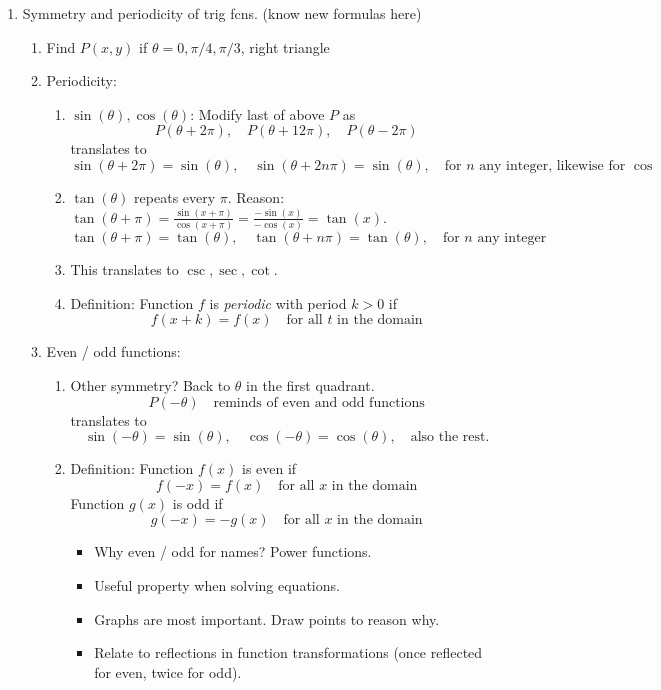 \documentclass{article}
\begin{document}
\begin{enumerate}
\item Symmetry and periodicity of trig fcns. (know new formulas here)
\begin{enumerate}
\item Find $P(x,y)$ if $\theta = 0, \pi/4, \pi/3$, right triangle
\item Periodicity:
\begin{enumerate}
\item $\sin(\theta),\cos(\theta)$: Modify last of above $P$ as
$$
P(\theta+2\pi),\quad P(\theta+12\pi), \quad P(\theta-2\pi)
$$
translates to
$$
\sin(\theta + 2\pi) = \sin(\theta), \quad \sin(\theta + 2n\pi) = \sin(\theta), \quad \text{for $n$ any integer, likewise for $\cos$}
$$
\item $\tan(\theta)$ repeats every $\pi$. Reason: $\tan(\theta + \pi) = \frac{\sin(x+\pi)}{\cos(x+\pi)} = \frac{-\sin(x)}{-\cos(x)}=\tan(x)$.
$$
\tan(\theta + \pi) = \tan(\theta), \quad \tan(\theta + n\pi) = \tan(\theta), \quad \text{for $n$ any integer}
$$
\item This translates to $\csc, \sec, \cot$.
\item Definition: Function $f$ is \emph{periodic} with period $k>0$ if
$$
f(x+k)=f(x) \quad \text{for all $t$ in the domain}
$$
\end{enumerate}
\item Even / odd functions:
\begin{enumerate}
\item Other symmetry? Back to $\theta$ in the first quadrant.
$$
P(-\theta) \quad \text{reminds of even and odd functions}
$$
translates to
$$
\sin(-\theta)=\sin(\theta), \quad \cos(-\theta)=\cos(\theta), \quad \text{also the rest.}
$$
\item Definition: Function $f(x)$ is even if 
$$
f(-x) = f(x) \quad \text{for all $x$ in the domain}
$$
Function $g(x)$ is odd if 
$$
g(-x) = -g(x) \quad \text{for all $x$ in the domain}
$$
\begin{itemize}
\item Why even / odd for names? Power functions.
\item Useful property when solving equations.
\item Graphs are most important. Draw points to reason why. 
\item Relate to reflections in function transformations (once reflected for even, twice for odd).
\end{itemize}
\end{enumerate}
\end{enumerate}
\end{enumerate}
\end{document}
